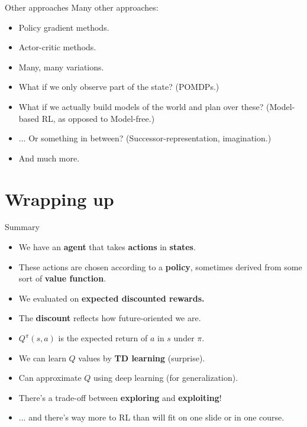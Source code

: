 \documentclass{beamer} %
\begin{document}
\begin{frame}{Other approaches}
Many other approaches:
\begin{itemize}
    \item<1-> Policy gradient methods.
    \item<2-> Actor-critic methods.
    \item<3-> Many, many variations.
\end{itemize}
\begin{itemize}
    \item<5-> What if we only observe part of the state? (POMDPs.) 
    \item<6-> What if we actually build models of the world and plan over these? (Model-based RL, as opposed to Model-free.) 
    \item<7-> ... Or something in between? (Successor-representation, imagination.)
    \item<8-> And much more.
\end{itemize}
\end{frame}

\section{Wrapping up}

\begin{frame}{Summary}
\begin{itemize}
\item We have an \textbf{agent} that takes \textbf{actions} in \textbf{states}. 
\item<2-> These actions are chosen according to a \textbf{policy}, sometimes derived from some sort of \textbf{value function}. 
\item<3-> We evaluated on \textbf{expected discounted rewards.}
\item<4-> The \textbf{discount} reflects how future-oriented we are.
\item<5-> \(Q^\pi(s,a)\) is the expected return of \(a\) in \(s\) under \(\pi\).
\item<6-> We can learn \(Q\) values by \textbf{TD learning} (surprise).
\item<7-> Can approximate \(Q\) using deep learning (for generalization). 
\item<8-> There's a trade-off between \textbf{exploring} and \textbf{exploiting}!
\item<9-> ... and there's way more to RL than will fit on one slide or in one course.
\end{itemize}
\end{frame}
\end{document}
